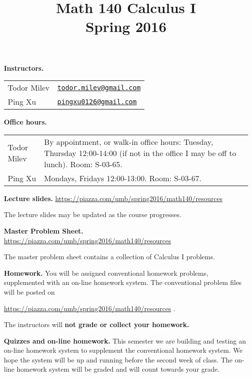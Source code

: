 \documentclass{article}
\title{\vskip -2cm 
 Math 140 Calculus I \\ Spring 2016}
\date{}
\newcommand{\websitebase}{https://piazza.com/umb/spring2016/math140}
\begin{document}
\maketitle


\noindent \textbf{Instructors.} 
\begin{tabular}{ll}
Todor Milev & \href{mailto:todor.milev@gmail.com}{\nolinkurl{todor.milev@gmail.com}} \\
Ping Xu & \href{mailto:pingxu0126@gmail.com}{\nolinkurl{pingxu0126@gmail.com}} 
\end{tabular}

\medskip
\noindent \textbf{Office hours. } \begin{tabular}{lp{12cm}}
Todor Milev & By appointment, or walk-in office hours: Tuesday, Thursday 12:00-14:00 (if not in the office I may be off to lunch).  Room: S-03-65.\\
Ping Xu&  Mondays, Fridays 12:00-13:00.  Room: S-03-67.
\end{tabular}





\medskip \noindent \textbf{Lecture slides. }  \url{\websitebase/resources}

\medskip\noindent The lecture slides may be updated as the course progresses.


\medskip \noindent \textbf{Master Problem Sheet. }  \url{\websitebase/resources} 

\medskip\noindent The master problem sheet contains a collection of Calculus I problems. 

\medskip
\noindent \textbf{Homework.} You will be assigned conventional homework problems, supplemented with an on-line homework system. The conventional problem files will be posted on

\url{\websitebase/resources} \quad \quad \quad .

\noindent  The instructors will \textbf{not grade or collect your homework.} 


\medskip
\noindent \textbf{Quizzes and on-line homework.} This semester we are building and testing an on-line homework system to supplement the conventional homework system. We hope the system will be up and running before the second week of class. The on-line homework system will be graded and will count towards your grade. 
\end{document}
